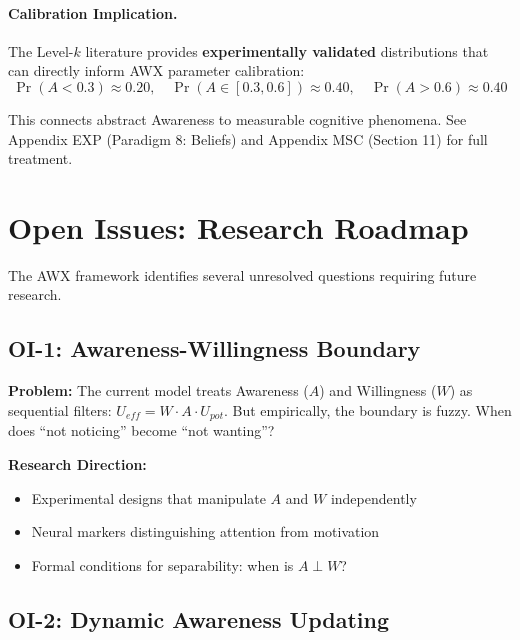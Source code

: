 \paragraph{Calibration Implication.}
The Level-$k$ literature provides \textbf{experimentally validated} distributions that can
directly inform AWX parameter calibration:
\begin{equation}
\Pr(A < 0.3) \approx 0.20, \quad \Pr(A \in [0.3, 0.6]) \approx 0.40, \quad \Pr(A > 0.6) \approx 0.40
\tag{AU-LK}
\end{equation}

This connects abstract Awareness to measurable cognitive phenomena.
See Appendix EXP (Paradigm 8: Beliefs) and Appendix MSC (Section 11) for full treatment.



\section{Open Issues: Research Roadmap}
\label{sec:open-issues}

The AWX framework identifies several unresolved questions requiring future research.

\subsection{OI-1: Awareness-Willingness Boundary}

\textbf{Problem:} The current model treats Awareness ($A$) and Willingness ($W$) as sequential filters: $U_{eff} = W \cdot A \cdot U_{pot}$. But empirically, the boundary is fuzzy. When does ``not noticing'' become ``not wanting''?

\textbf{Research Direction:}
\begin{itemize}[nosep]
    \item Experimental designs that manipulate $A$ and $W$ independently
    \item Neural markers distinguishing attention from motivation
    \item Formal conditions for separability: when is $A \perp W$?
\end{itemize}

\subsection{OI-2: Dynamic Awareness Updating}

